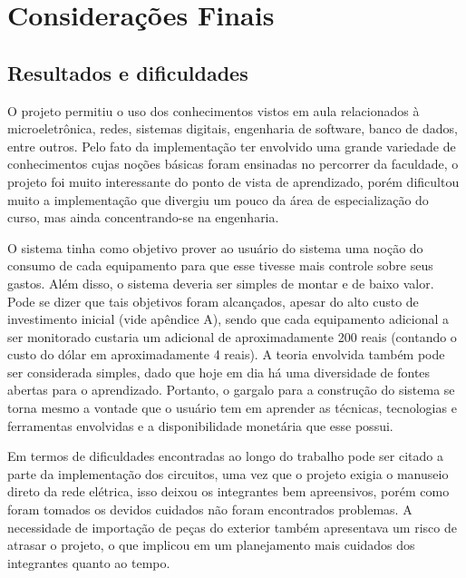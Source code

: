 \chapter{Considerações Finais}
\label{Cap:consideracoes_finais}

\section{Resultados e dificuldades}

O projeto permitiu o uso dos conhecimentos vistos em aula relacionados à microeletrônica, redes, sistemas digitais, engenharia de software, banco de dados, entre outros. Pelo fato da implementação ter envolvido uma grande variedade de conhecimentos cujas noções básicas foram ensinadas no percorrer da faculdade, o projeto foi muito interessante do ponto de vista de aprendizado, porém dificultou muito a implementação que divergiu um pouco da área de especialização do curso, mas ainda concentrando-se na engenharia.

O sistema tinha como objetivo prover ao usuário do sistema uma noção do consumo de cada equipamento para que esse tivesse mais controle sobre seus gastos. Além disso, o sistema deveria ser simples de montar e de baixo valor. Pode se dizer que tais objetivos foram alcançados, apesar do alto custo de investimento inicial (vide apêndice A), sendo que cada equipamento adicional a ser monitorado custaria um adicional de aproximadamente 200 reais (contando o custo do dólar em aproximadamente 4 reais). A teoria envolvida também pode ser considerada simples, dado que hoje em dia há uma diversidade de fontes abertas para o aprendizado. Portanto, o gargalo para a construção do sistema se torna mesmo a vontade que o usuário tem em aprender as técnicas, tecnologias e ferramentas envolvidas e a disponibilidade monetária que esse possui.

Em termos de dificuldades encontradas ao longo do trabalho pode ser citado a parte da implementação dos circuitos, uma vez que o projeto exigia o manuseio direto da rede elétrica, isso deixou os integrantes bem apreensivos, porém como foram tomados os devidos cuidados não foram encontrados problemas. A necessidade de importação de peças do exterior também apresentava um risco de atrasar o projeto, o que implicou em um planejamento mais cuidados dos integrantes quanto ao tempo.